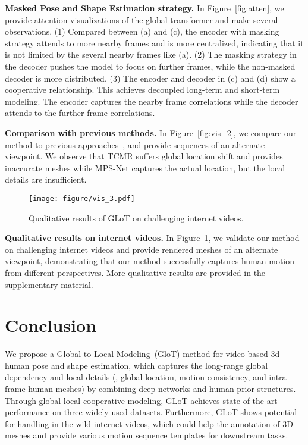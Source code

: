 \documentclass[10pt,twocolumn,letterpaper]{article}
\begin{document}
		\noindent\textbf{Masked Pose and Shape Estimation strategy.}
		In Figure~\ref{fig:atten}, we provide attention visualizations of the global transformer and make several observations. (1) Compared between (a) and (c), the encoder with masking strategy attends to more nearby frames and is more centralized, indicating that it is not limited by the several nearby frames like (a). (2) The masking strategy in the decoder pushes the model to focus on further frames, while the non-masked decoder is more distributed.
	(3) The encoder and decoder in (c) and (d) show a cooperative relationship. This achieves decoupled long-term and short-term modeling.
		The encoder captures the nearby frame correlations while the decoder attends to the further frame correlations. 
		
		
		\noindent\textbf{Comparison with previous methods.}
		In Figure~\ref{fig:vis_2}, we compare our method to previous approaches~\cite{TCMR, MPS-net}, and provide sequences of an alternate viewpoint. We observe that TCMR suffers global location shift and provides inaccurate meshes while MPS-Net captures the actual location, but the local details are insufficient.
		\begin{figure}[!t]
			\texttt{[image: figure/vis\_3.pdf]}
			\vspace{-2 em}
			\caption{Qualitative results of GLoT on challenging internet videos.}
\label{fig:vis_3}
			\vspace{-1.5 em}
		\end{figure}
		
		\noindent\textbf{Qualitative results on internet videos.}
		In Figure~\ref{fig:vis_3}, we validate our method on challenging internet videos and provide rendered meshes of an alternate viewpoint, demonstrating that our method successfully captures human motion from different perspectives. More qualitative results are provided in the supplementary material.
		
		\section{Conclusion}
		We propose a Global-to-Local Modeling~(GloT) method for video-based 3d human pose and shape estimation, which captures the long-range global dependency and local details (\eg, global location, motion consistency, and intra-frame human meshes) by combining deep networks and human prior structures.
		Through global-local cooperative modeling, GLoT achieves state-of-the-art performance on three widely used datasets.
		Furthermore, GLoT shows potential for handling in-the-wild internet videos, which could help the annotation of 3D meshes and provide various motion sequence templates for downstream tasks. 
	
\end{document}
